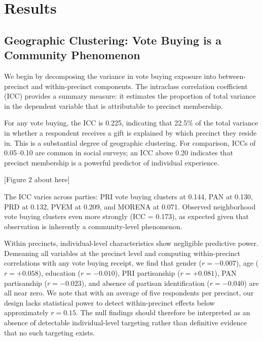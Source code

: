 \documentclass[12pt,letterpaper]{article}
\begin{document}
\section{Results}

\subsection{Geographic Clustering: Vote Buying is a Community Phenomenon}

We begin by decomposing the variance in vote buying exposure into between-precinct and within-precinct components. The intraclass correlation coefficient (ICC) provides a summary measure: it estimates the proportion of total variance in the dependent variable that is attributable to precinct membership.

For any vote buying, the ICC is 0.225, indicating that 22.5\% of the total variance in whether a respondent receives a gift is explained by which precinct they reside in. This is a substantial degree of geographic clustering. For comparison, ICCs of 0.05--0.10 are common in social surveys; an ICC above 0.20 indicates that precinct membership is a powerful predictor of individual experience.

[Figure 2 about here]

The ICC varies across parties: PRI vote buying clusters at 0.144, PAN at 0.130, PRD at 0.132, PVEM at 0.209, and MORENA at 0.071. Observed neighborhood vote buying clusters even more strongly (ICC = 0.173), as expected given that observation is inherently a community-level phenomenon.

Within precincts, individual-level characteristics show negligible predictive power. Demeaning all variables at the precinct level and computing within-precinct correlations with any vote buying receipt, we find that gender ($r = -0.007$), age ($r = +0.058$), education ($r = -0.010$), PRI partisanship ($r = +0.081$), PAN partisanship ($r = -0.023$), and absence of partisan identification ($r = -0.040$) are all near zero. We note that with an average of five respondents per precinct, our design lacks statistical power to detect within-precinct effects below approximately $r = 0.15$. The null findings should therefore be interpreted as an absence of detectable individual-level targeting rather than definitive evidence that no such targeting exists.
\end{document}
